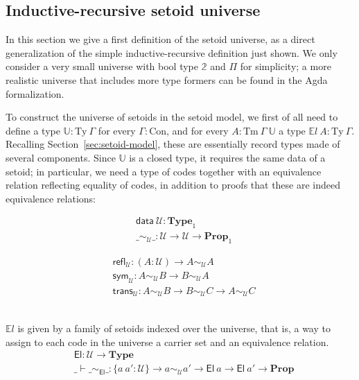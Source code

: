 \documentclass[a4paper,UKenglish,cleveref, autoref, thm-restate]{lipics-v2019}
\newcommand{\GG}{\Gamma}
\newcommand{\setoidU}{\mathcal{U}}
\newcommand{\mType}{\mathbf{Type}}
\newcommand{\mProp}{\mathbf{Prop}}
\newcommand{\Con}{\mathrm{Con}}
\newcommand{\Ty}{\mathrm{Ty}}
\newcommand{\Tm}{\mathrm{Tm}}
\newcommand{\El}{\textsf{El}}
\newcommand{\Uty}{\mathds{U}}
\newcommand{\EL}{\mathds{E}l}
\newcommand{\equ}[2]{#1 \sim_\setoidU #2}
\providecommand\mathbbm{\mathbb}
\begin{document}
\subsection{Inductive-recursive setoid universe}\label{ir-setoid-universe}

In this section we give a first definition of the setoid universe, as a direct
generalization of the simple inductive-recursive definition just shown. We only
consider a very small universe with bool type $\mathbbm{2}$ and $\Pi$ for
simplicity; a more realistic universe that includes more type formers
can be found in the Agda formalization.

To construct the universe of setoids in the setoid model, we first of all need
to define a type $\Uty : \Ty\ \GG$ for every $\GG : \Con$, and for every $A :
\Tm\ \GG\ \Uty$ a type $\mathds{E}l\ A : \Ty\ \GG$. Recalling
Section~\ref{sec:setoid-model}, these are essentially record types made of several
components. Since $\Uty$ is a closed type, it requires the same data of a
setoid; in particular, we need a type of codes together with an equivalence
relation reflecting equality of codes, in addition to proofs that these are
indeed equivalence relations: \\
%
\begin{minipage}{0.5\textwidth}
\begin{align*}
  & \textsf{data} \ \setoidU : \mType_1 \\
  & \_\sim_\setoidU\_ : \setoidU \to \setoidU \to \mProp_1
\end{align*}
\end{minipage}
\begin{minipage}{0.5\textwidth}
\begin{align*}
  & \textsf{refl}_\setoidU : (A : \setoidU) \to \equ{A}{A} \\
  & \textsf{sym}_\setoidU : \equ{A}{B} \to \equ{B}{A} \\
  & \textsf{trans}_\setoidU : \equ{A}{B} \to \equ{B}{C} \to \equ{A}{C}
\end{align*}
\end{minipage}
\\

$\EL$ is given by a family of setoids indexed over the universe, that is, a way
to assign to each code in the universe a carrier set and an equivalence
relation.
%
\begin{align*}
  & \El : \setoidU \to \mType \\
  & \_\vdash\_\sim_\El\_ : \{a\ a' : \setoidU\} \to a \sim_\setoidU a' \to \El\ a \to \El\ a' \to \mProp
\end{align*}
\end{document}
